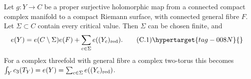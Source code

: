 
\begin{proposition}\hypertarget{tag-01FG}{}\label{cdp:st:C2a}


Let $g:Y\to C$ be a proper surjective holomorphic map from a connected compact complex manifold to a compact Riemann surface, with connected general fibre $F$. Let $\Sigma\subset C$ contain every critical value. Then $\Sigma$ can be chosen finite, and
\[
 e(Y)=e(C\setminus\Sigma)e(F)+\sum_{c\in\Sigma}e((Y_c)_{\rm red}). \tag{C.1}\hypertarget{tag-008N}{}\label{cdp:eq:C.1}
\]
For a complex threefold with general fibre a complex two-torus this becomes
$\int_Yc_3(T_Y)=e(Y)=\sum_{c\in\Sigma}e((Y_c)_{\rm red})$.
\end{proposition}

